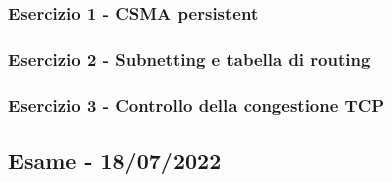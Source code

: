 \documentclass[a4paper]{article}
\begin{document}
	\subsubsection{Esercizio 1 - CSMA persistent}
	
	\subsubsection{Esercizio 2 - Subnetting e tabella di routing}
	
	\subsubsection{Esercizio 3 - Controllo della congestione TCP}
	
	\newpage

	\subsection[\textbf{Esame - 18/07/2022}]{Esame - 18/07/2022}
	
\end{document}
